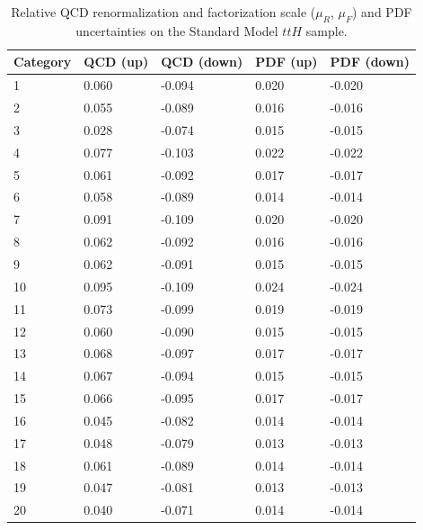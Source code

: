 \begin{table}[ht]
\begin{center}
\begin{tabular}{lllll}
Category & QCD (up) & QCD (down) & PDF (up) & PDF (down) \\ \hline
1  &     0.060 &      -0.094 &   0.020 &    -0.020 \\
2  &     0.055 &      -0.089 &   0.016 &    -0.016 \\
3  &     0.028 &      -0.074 &   0.015 &    -0.015 \\
4  &     0.077 &      -0.103 &   0.022 &    -0.022 \\
5  &     0.061 &      -0.092 &   0.017 &    -0.017 \\
6  &     0.058 &      -0.089 &   0.014 &    -0.014 \\
7  &     0.091 &      -0.109 &   0.020 &    -0.020 \\
8  &     0.062 &      -0.092 &   0.016 &    -0.016 \\
9  &     0.062 &      -0.091 &   0.015 &    -0.015 \\
10 &     0.095 &      -0.109 &   0.024 &    -0.024 \\
11 &     0.073 &      -0.099 &   0.019 &    -0.019 \\
12 &     0.060 &      -0.090 &   0.015 &    -0.015 \\ \hline
13 &     0.068 &      -0.097 &   0.017 &    -0.017 \\
14 &     0.067 &      -0.094 &   0.015 &    -0.015 \\
15 &     0.066 &      -0.095 &   0.017 &    -0.017 \\
16 &     0.045 &      -0.082 &   0.014 &    -0.014 \\
17 &     0.048 &      -0.079 &   0.013 &    -0.013 \\
18 &     0.061 &      -0.089 &   0.014 &    -0.014 \\
19 &     0.047 &      -0.081 &   0.013 &    -0.013 \\
20 &     0.040 &      -0.071 &   0.014 &    -0.014 \\ \hline
\hline
\end{tabular}
\end{center}
\vspace{-0.5cm}
\caption{Relative QCD renormalization and factorization scale ($\mu_R$, $\mu_F$) and PDF uncertainties on the Standard Model $ttH$ sample.}
\label{tab:qcdpdf_ttH}
\end{table}

